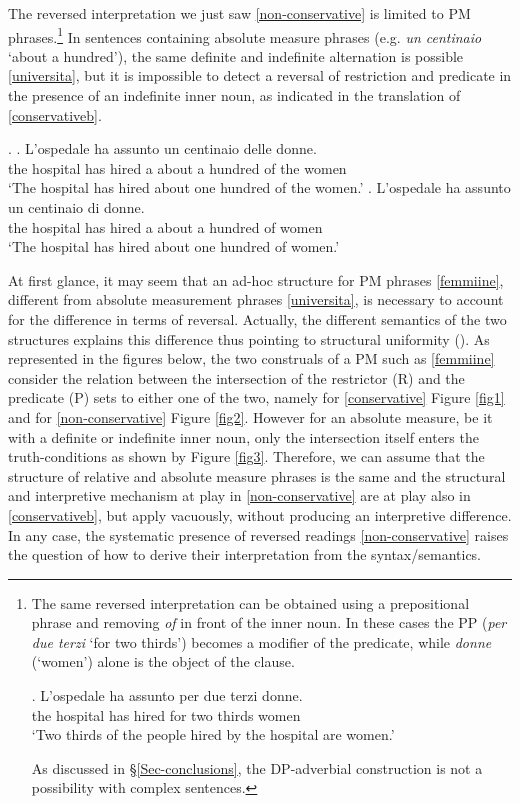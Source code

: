 \documentclass[charis, linguex]{glossa}
\begin{document}
The reversed interpretation we just saw \ref{non-conservative} is limited to PM phrases.\footnote{\label{footnote4}The same reversed interpretation can be obtained using a prepositional phrase and removing \textit{of} in front of the inner noun.  In these cases the PP (\textit{per due terzi} `for two thirds') becomes a modifier of the predicate, while \textit{donne} (`women') alone is the object of the clause. 

\exg. L'ospedale ha assunto per due terzi donne. \\ 
         {the hospital} has hired for two thirds women \\ 
         \glt  `Two thirds of the people hired by the hospital are women.'
		 				  
As discussed in  \S\ref{Sec-conclusions}, the DP-adverbial construction is not a possibility with complex sentences.} In sentences containing absolute measure phrases (e.g. \textit{un centinaio} `about a hundred'), the same definite and indefinite alternation is possible \ref{universita}, but it is impossible to detect a reversal of restriction and predicate in the presence of an indefinite inner noun, as indicated in the translation of \ref{conservativeb}.
		  
		  
\ex. \label{universita} 
     \ag. L'ospedale ha assunto un centinaio delle donne. \\ 
	      {the hospital} has hired a {about a hundred} {of the} women \\ 
	\glt `The hospital has hired about one hundred of the women.'\label{conservativea}	
     \bg. L'ospedale ha assunto un centinaio di donne. \\  
		  {the hospital} has hired a {about a hundred} of women \\
	\glt `The hospital has hired about one hundred of women.' \label{conservativeb}	
   	 
	 
At first glance, it may seem that an ad-hoc structure for PM phrases \ref{femmiine}, different from absolute measurement phrases \ref{universita}, is necessary to account for the difference in terms of reversal. Actually, the different semantics of the two structures explains this difference thus pointing to structural uniformity (\citealt[\S\S2.2]{ahn15b}). As represented in the figures below, the two construals of a PM such as \ref{femmiine} consider the relation between the intersection of the restrictor (R) and the predicate (P) sets to either one of the two, namely for \ref{conservative} Figure \ref{fig1} and for \ref{non-conservative} Figure \ref{fig2}. However for an absolute measure, be it with a definite or indefinite inner noun, only the intersection itself enters the truth-conditions as shown by Figure \ref{fig3}. Therefore, we can assume that the structure of relative and absolute measure phrases is the same and the structural and interpretive mechanism at play in \ref{non-conservative} are at play also in \ref{conservativeb}, but apply vacuously, without producing an interpretive difference. In any case, the systematic presence of reversed readings \ref{non-conservative} raises the question of how to derive their interpretation from the syntax/semantics. 
\end{document}
